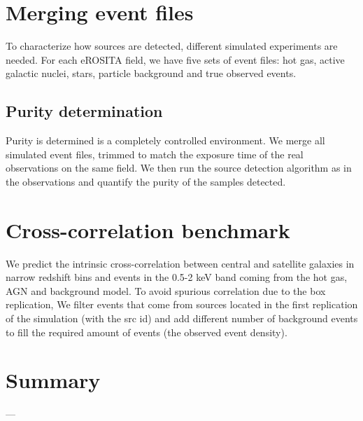 \documentclass[twocolumn,iop]{openjournal}
\begin{document}
\clearpage
\section{Merging event files}

To characterize how sources are detected, different simulated experiments are needed. For each eROSITA field, we have five sets of event files: hot gas, active galactic nuclei, stars, particle background and true observed events. 

\subsection{Purity determination}

Purity is determined is a completely controlled environment. 
We merge all simulated event files, trimmed to match the exposure time of the real observations on the same field. 
We then run the source detection algorithm as in the observations and quantify the purity of the samples detected. 

\clearpage
\section{Cross-correlation benchmark}

We predict the intrinsic cross-correlation between central and satellite galaxies in narrow redshift bins and events in the 0.5-2 keV band coming from the hot gas, AGN and background model.
To avoid spurious correlation due to the box replication,
We filter events that come from sources located in the first replication of the simulation (with the src id) and add different number of background events to fill the required amount of events (the observed event density).


\clearpage
\section{Summary}

\begin{acknowledgements}
---
\end{acknowledgements}




\appendix
\end{document}
